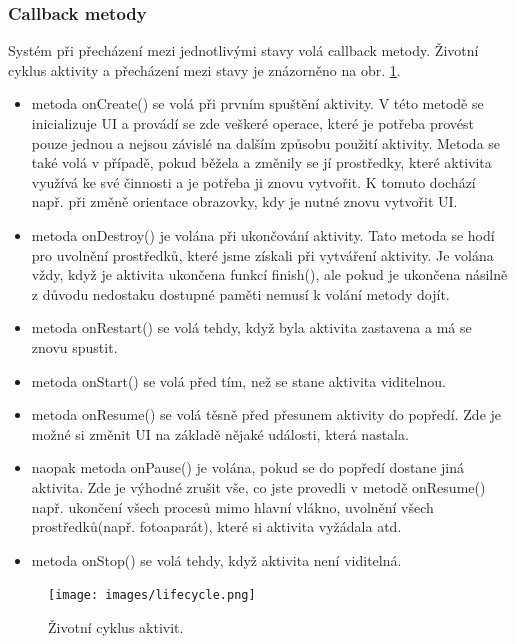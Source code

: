 \documentclass[12pt]{article}
\begin{document}
\subsubsection{Callback metody}
Systém při přecházení mezi jednotlivými stavy volá callback metody. Životní cyklus aktivity a přecházení mezi stavy je znázorněno na obr. \ref{lifecycle}.

\begin{itemize}
\item metoda onCreate() se volá při prvním spuštění aktivity. V této metodě se inicializuje UI a provádí se zde veškeré operace, které je potřeba provést pouze jednou a nejsou závislé na dalším způsobu použití aktivity. Metoda se také volá v případě, pokud běžela a změnily se jí prostředky, které aktivita využívá ke své činnosti a je potřeba ji znovu vytvořit. K tomuto dochází např. při změně orientace obrazovky, kdy je nutné znovu vytvořit UI.
\item metoda onDestroy() je volána při ukončování aktivity. Tato metoda se hodí pro uvolnění prostředků, které jsme získali při vytváření aktivity. Je volána vždy, když je aktivita ukončena funkcí finish(), ale pokud je ukončena násilně z důvodu nedostaku dostupné paměti nemusí k volání metody dojít.
\item metoda onRestart() se volá tehdy, když byla aktivita zastavena a má se znovu spustit.
\item metoda onStart() se volá před tím, než se stane aktivita viditelnou.
\item metoda onResume() se volá těsně před přesunem aktivity do popředí. Zde je možné si změnit UI na základě nějaké události, která nastala.
\item naopak metoda onPause() je volána, pokud se do popředí dostane jiná aktivita. Zde je výhodné zrušit vše, co jste provedli v metodě onResume() např. ukončení všech procesů mimo hlavní vlákno, uvolnění všech prostředků(např. fotoaparát), které si aktivita vyžádala atd.
\item metoda onStop() se volá tehdy, když aktivita není viditelná.
\end{itemize}
\newpage
\begin{figure}[ht]
\centerline{\texttt{[image: images/lifecycle.png]}}
\caption{Životní cyklus aktivit.} \label{lifecycle}
\end{figure}
\end{document}
